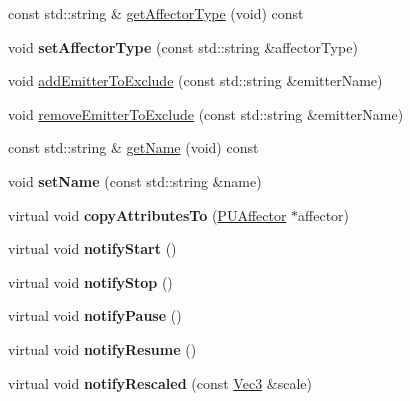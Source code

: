 \begin{DoxyCompactItemize}
\item 
const std\+::string \& \hyperlink{classPUAffector_ad3a61fcbb1b3f0c38363aad914389e0c}{get\+Affector\+Type} (void) const
\item 
\mbox{\label{classPUAffector_ad8ce665da2249f93fbc2d50ab0c1390c}} 
void {\bfseries set\+Affector\+Type} (const std\+::string \&affector\+Type)
\item 
void \hyperlink{classPUAffector_aaf379b616eb066ce9535a56c1c4bd4cd}{add\+Emitter\+To\+Exclude} (const std\+::string \&emitter\+Name)
\item 
void \hyperlink{classPUAffector_a3656722deeec360894ccb7637b597516}{remove\+Emitter\+To\+Exclude} (const std\+::string \&emitter\+Name)
\item 
const std\+::string \& \hyperlink{classPUAffector_af5f6499f64032484591415629a1caea1}{get\+Name} (void) const
\item 
\mbox{\label{classPUAffector_ada781a8003fec4801edaead5f4a23878}} 
void {\bfseries set\+Name} (const std\+::string \&name)
\item 
\mbox{\label{classPUAffector_a3d70e40ea2e88029d40cc2311ee4816d}} 
virtual void {\bfseries copy\+Attributes\+To} (\hyperlink{classPUAffector}{P\+U\+Affector} $\ast$affector)
\item 
\mbox{\label{classPUAffector_ab50ebbc94627e07ac3f074d958ac657c}} 
virtual void {\bfseries notify\+Start} ()
\item 
\mbox{\label{classPUAffector_a5c2d5f695174843ec2b5944888e9785a}} 
virtual void {\bfseries notify\+Stop} ()
\item 
\mbox{\label{classPUAffector_a4d281ac92d401ebd19b2d84b3b05b9f2}} 
virtual void {\bfseries notify\+Pause} ()
\item 
\mbox{\label{classPUAffector_a7080d5dfac3f415ee29e6bd0f87ae64e}} 
virtual void {\bfseries notify\+Resume} ()
\item 
\mbox{\label{classPUAffector_ac8796131689d39aed245ebdf71872d64}} 
virtual void {\bfseries notify\+Rescaled} (const \hyperlink{classVec3}{Vec3} \&scale)
\item 

\end{DoxyCompactItemize}
